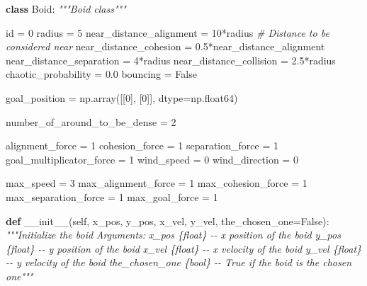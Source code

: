 \documentclass[
]{article}
\newenvironment{Shaded}{}{}
\newcommand{\BuiltInTok}[1]{#1}
\newcommand{\CommentTok}[1]{\textcolor[rgb]{0.38,0.63,0.69}{\textit{#1}}}
\newcommand{\DecValTok}[1]{\textcolor[rgb]{0.25,0.63,0.44}{#1}}
\newcommand{\FloatTok}[1]{\textcolor[rgb]{0.25,0.63,0.44}{#1}}
\newcommand{\FunctionTok}[1]{\textcolor[rgb]{0.02,0.16,0.49}{#1}}
\newcommand{\KeywordTok}[1]{\textcolor[rgb]{0.00,0.44,0.13}{\textbf{#1}}}
\newcommand{\NormalTok}[1]{#1}
\newcommand{\OperatorTok}[1]{\textcolor[rgb]{0.40,0.40,0.40}{#1}}
\newcommand{\VariableTok}[1]{\textcolor[rgb]{0.10,0.09,0.49}{#1}}
\begin{document}
\begin{Shaded}
\begin{Highlighting}[]
\KeywordTok{class}\NormalTok{ Boid:}
    \CommentTok{"""Boid class"""}

    \BuiltInTok{id} \OperatorTok{=} \DecValTok{0}
\NormalTok{    radius }\OperatorTok{=} \DecValTok{5}
\NormalTok{    near\_distance\_alignment }\OperatorTok{=} \DecValTok{10}\OperatorTok{*}\NormalTok{radius  }\CommentTok{\# Distance to be considered near}
\NormalTok{    near\_distance\_cohesion }\OperatorTok{=} \FloatTok{0.5}\OperatorTok{*}\NormalTok{near\_distance\_alignment}
\NormalTok{    near\_distance\_separation }\OperatorTok{=} \DecValTok{4}\OperatorTok{*}\NormalTok{radius}
\NormalTok{    near\_distance\_collision }\OperatorTok{=} \FloatTok{2.5}\OperatorTok{*}\NormalTok{radius}
\NormalTok{    chaotic\_probability }\OperatorTok{=} \FloatTok{0.0}
\NormalTok{    bouncing }\OperatorTok{=} \VariableTok{False}

\NormalTok{    goal\_position }\OperatorTok{=}\NormalTok{ np.array([[}\DecValTok{0}\NormalTok{], [}\DecValTok{0}\NormalTok{]], dtype}\OperatorTok{=}\NormalTok{np.float64)}

\NormalTok{    number\_of\_around\_to\_be\_dense }\OperatorTok{=} \DecValTok{2}

\NormalTok{    alignment\_force }\OperatorTok{=} \DecValTok{1}
\NormalTok{    cohesion\_force }\OperatorTok{=} \DecValTok{1}
\NormalTok{    separation\_force }\OperatorTok{=} \DecValTok{1}
\NormalTok{    goal\_multiplicator\_force }\OperatorTok{=} \DecValTok{1}
\NormalTok{    wind\_speed }\OperatorTok{=} \DecValTok{0}
\NormalTok{    wind\_direction }\OperatorTok{=} \DecValTok{0}

\NormalTok{    max\_speed }\OperatorTok{=} \DecValTok{3}
\NormalTok{    max\_alignment\_force }\OperatorTok{=} \DecValTok{1}
\NormalTok{    max\_cohesion\_force }\OperatorTok{=} \DecValTok{1}
\NormalTok{    max\_separation\_force }\OperatorTok{=} \DecValTok{1}
\NormalTok{    max\_goal\_force }\OperatorTok{=} \DecValTok{1}

    \KeywordTok{def} \FunctionTok{\_\_init\_\_}\NormalTok{(}\VariableTok{self}\NormalTok{, x\_pos, y\_pos, x\_vel, y\_vel, the\_chosen\_one}\OperatorTok{=}\VariableTok{False}\NormalTok{):}
        \CommentTok{"""Initialize the boid}
\CommentTok{        Arguments:}
\CommentTok{            x\_pos \{float\} {-}{-} x position of the boid}
\CommentTok{            y\_pos \{float\} {-}{-} y position of the boid}
\CommentTok{            x\_vel \{float\} {-}{-} x velocity of the boid}
\CommentTok{            y\_vel \{float\} {-}{-} y velocity of the boid}
\CommentTok{            the\_chosen\_one \{bool\} {-}{-} True if the boid is the chosen one"""}


\end{Highlighting}
\end{Shaded}
\end{document}
